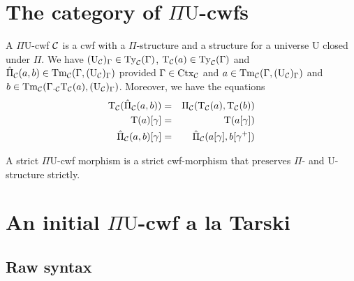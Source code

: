 \documentclass{lmcs}
\def\UU{\mathrm{U}}
\def\Ta{\mathrm{T}}
\def\Pihat{\hat{\Pi}}
\begin{document}
\section{The category of $\Pi\UU$-cwfs}

 A $\Pi \UU$-cwf ${\mathcal C}$ is a cwf with a $\Pi$-structure and a structure for a universe $\UU$ closed under $\Pi$. We have $(\UU_\C)_\Gamma \in \Ty_\C(\Gamma)$, $\Ta_\C(a) \in \Ty_\C(\Gamma)$ and $\Pihat_\C(a,b) \in \Tm_\C(\Gamma,(\UU_\C)_\Gamma)$ provided $\Gamma \in \mathrm{Ctx}_{\mathcal C}$ and $a  \in \Tm_\C(\Gamma,(\UU_\C)_\Gamma)$ and 
$b \in \Tm_\C(\Gamma ._\C \Ta_\C(a),(\UU_\C)_\Gamma)$. Moreover, we have the equations
\begin{eqnarray*}
\Ta_\C(\Pihat_\C(a,b)) &= &\Pi_\C(\Ta_\C(a),\Ta_\C(b))\\
\Ta(a)[\gamma] &=& \Ta(a[\gamma])\\
\Pihat_\C(a,b)[\gamma] &=& \Pihat_\C(a[\gamma],b[\gamma^+])
\end{eqnarray*}

A strict $\Pi\UU$-cwf morphism is a strict cwf-morphism that preserves $\Pi$- and $\UU$-structure strictly.

\section{An initial $\Pi\UU$-cwf a la Tarski}
\label{sec:syntax}

\subsection{Raw syntax}\label{sec:grammar}
\end{document}
